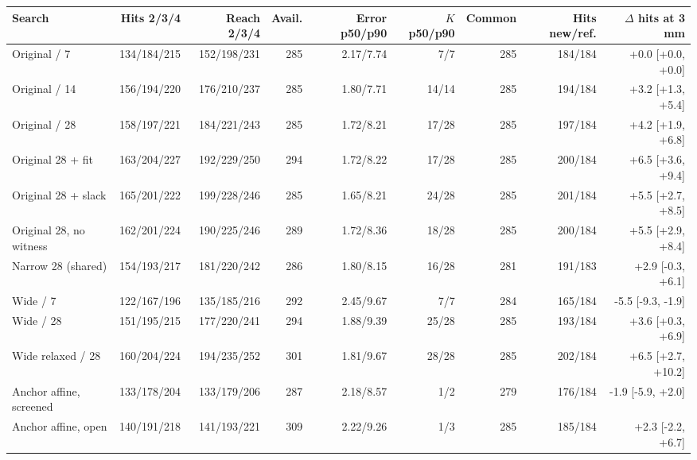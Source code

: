 \begin{tabular}{@{}lrrrrrrrr@{}}
\toprule
Search & Hits 2/3/4 & Reach 2/3/4 & Avail. & Error p50/p90 & $K$ p50/p90 & Common & Hits new/ref. & $\Delta$ hits at 3 mm \\
\midrule
Original / 7 & 134/184/215 & 152/198/231 & 285 & 2.17/7.74 & 7/7 & 285 & 184/184 & +0.0 [+0.0, +0.0] \\
Original / 14 & 156/194/220 & 176/210/237 & 285 & 1.80/7.71 & 14/14 & 285 & 194/184 & +3.2 [+1.3, +5.4] \\
Original / 28 & 158/197/221 & 184/221/243 & 285 & 1.72/8.21 & 17/28 & 285 & 197/184 & +4.2 [+1.9, +6.8] \\
Original 28 + fit & 163/204/227 & 192/229/250 & 294 & 1.72/8.22 & 17/28 & 285 & 200/184 & +6.5 [+3.6, +9.4] \\
Original 28 + slack & 165/201/222 & 199/228/246 & 285 & 1.65/8.21 & 24/28 & 285 & 201/184 & +5.5 [+2.7, +8.5] \\
Original 28, no witness & 162/201/224 & 190/225/246 & 289 & 1.72/8.36 & 18/28 & 285 & 200/184 & +5.5 [+2.9, +8.4] \\
Narrow 28 (shared) & 154/193/217 & 181/220/242 & 286 & 1.80/8.15 & 16/28 & 281 & 191/183 & +2.9 [-0.3, +6.1] \\
Wide / 7 & 122/167/196 & 135/185/216 & 292 & 2.45/9.67 & 7/7 & 284 & 165/184 & -5.5 [-9.3, -1.9] \\
Wide / 28 & 151/195/215 & 177/220/241 & 294 & 1.88/9.39 & 25/28 & 285 & 193/184 & +3.6 [+0.3, +6.9] \\
Wide relaxed / 28 & 160/204/224 & 194/235/252 & 301 & 1.81/9.67 & 28/28 & 285 & 202/184 & +6.5 [+2.7, +10.2] \\
Anchor affine, screened & 133/178/204 & 133/179/206 & 287 & 2.18/8.57 & 1/2 & 279 & 176/184 & -1.9 [-5.9, +2.0] \\
Anchor affine, open & 140/191/218 & 141/193/221 & 309 & 2.22/9.26 & 1/3 & 285 & 185/184 & +2.3 [-2.2, +6.7] \\
\bottomrule
\end{tabular}
